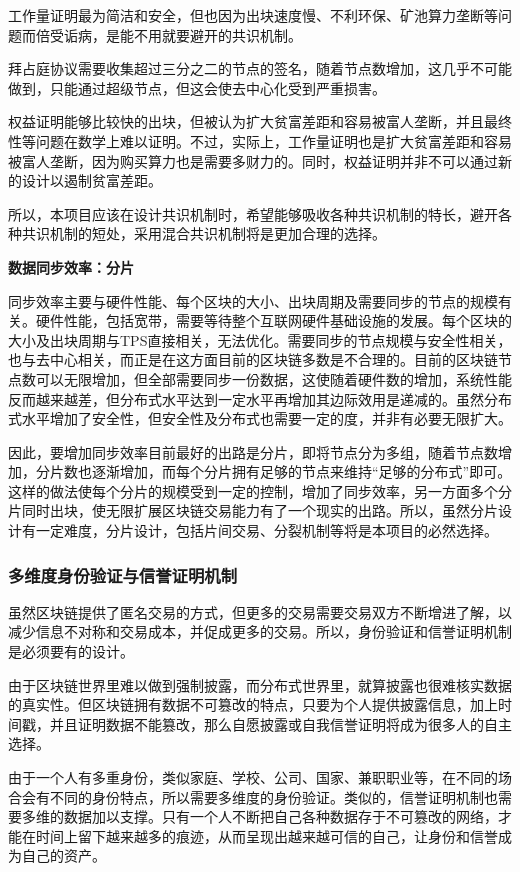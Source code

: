 \documentclass[a4paper,12pt]{article}
\begin{document}
工作量证明最为简洁和安全，但也因为出块速度慢、不利环保、矿池算力垄断等问题而倍受诟病，是能不用就要避开的共识机制。

拜占庭协议需要收集超过三分之二的节点的签名，随着节点数增加，这几乎不可能做到，只能通过超级节点，但这会使去中心化受到严重损害。

权益证明能够比较快的出块，但被认为扩大贫富差距和容易被富人垄断，并且最终性等问题在数学上难以证明。不过，实际上，工作量证明也是扩大贫富差距和容易被富人垄断，因为购买算力也是需要多财力的。同时，权益证明并非不可以通过新的设计以遏制贫富差距。

所以，本项目应该在设计共识机制时，希望能够吸收各种共识机制的特长，避开各种共识机制的短处，采用混合共识机制将是更加合理的选择。

\textbf{数据同步效率：分片}

同步效率主要与硬件性能、每个区块的大小、出块周期及需要同步的节点的规模有关。硬件性能，包括宽带，需要等待整个互联网硬件基础设施的发展。每个区块的大小及出块周期与TPS直接相关，无法优化。需要同步的节点规模与安全性相关，也与去中心相关，而正是在这方面目前的区块链多数是不合理的。目前的区块链节点数可以无限增加，但全部需要同步一份数据，这使随着硬件数的增加，系统性能反而越来越差，但分布式水平达到一定水平再增加其边际效用是递减的。虽然分布式水平增加了安全性，但安全性及分布式也需要一定的度，并非有必要无限扩大。

因此，要增加同步效率目前最好的出路是分片，即将节点分为多组，随着节点数增加，分片数也逐渐增加，而每个分片拥有足够的节点来维持“足够的分布式”即可。这样的做法使每个分片的规模受到一定的控制，增加了同步效率，另一方面多个分片同时出块，使无限扩展区块链交易能力有了一个现实的出路。所以，虽然分片设计有一定难度，分片设计，包括片间交易、分裂机制等将是本项目的必然选择。

\subsubsection{多维度身份验证与信誉证明机制}

虽然区块链提供了匿名交易的方式，但更多的交易需要交易双方不断增进了解，以减少信息不对称和交易成本，并促成更多的交易。所以，身份验证和信誉证明机制是必须要有的设计。

由于区块链世界里难以做到强制披露，而分布式世界里，就算披露也很难核实数据的真实性。但区块链拥有数据不可篡改的特点，只要为个人提供披露信息，加上时间戳，并且证明数据不能篡改，那么自愿披露或自我信誉证明将成为很多人的自主选择。

由于一个人有多重身份，类似家庭、学校、公司、国家、兼职职业等，在不同的场合会有不同的身份特点，所以需要多维度的身份验证。类似的，信誉证明机制也需要多维的数据加以支撑。只有一个人不断把自己各种数据存于不可篡改的网络，才能在时间上留下越来越多的痕迹，从而呈现出越来越可信的自己，让身份和信誉成为自己的资产。
\end{document}
